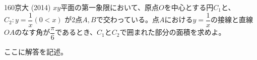 \begin{thm}{160}{}{京大 (2014)}
 $xy$平面の第一象限において、原点$O$を中心とする円$C_1$と、$C_2: y=\dfrac{1}{x} (0<x)$ が2点$A, B$で交わっている。点$A$における$y=\dfrac{1}{x}$の接線と直線$OA$のなす角が$\dfrac{\pi}{6}$であるとき、$C_1$と$C_2$で囲まれた部分の面積を求めよ。
\end{thm}

ここに解答を記述。